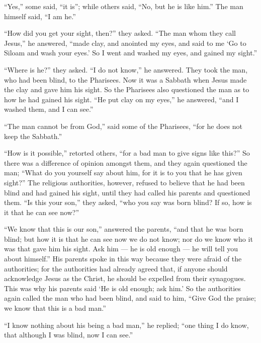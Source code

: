  ``Yes,'' some said, ``it is''; while others said, ``No, but
he is like him.'' The man himself said, ``I am he.''

 ``How did you get your sight, then?'' they asked.
 ``The man whom they call Jesus,'' he answered, ``made
clay, and anointed my eyes, and said to me `Go to Siloam and wash your
eyes.' So I went and washed my eyes, and gained my sight.''

 ``Where is he?'' they asked. ``I do not know,'' he
answered.  They took the man, who had been blind, to the
Pharisees.  Now it was a Sabbath when Jesus made the clay
and gave him his sight.  So the Pharisees also questioned
the man as to how he had gained his sight. ``He put clay on my eyes,''
he answered, ``and I washed them, and I can see.''

 ``The man cannot be from God,'' said some of the
Pharisees, ``for he does not keep the Sabbath.''

``How is it possible,'' retorted others, ``for a bad man to give signs
like this?''  So there was a difference of opinion amongst
them, and they again questioned the man; ``What do you yourself say
about him, for it is to you that he has given sight?''  The
religious authorities, however, refused to believe that he had been
blind and had gained his sight, until they had called his parents and
questioned them.  ``Is this your son,'' they asked, ``who
you say was born blind? If so, how is it that he can see now?''

 ``We know that this is our son,'' answered the parents,
``and that he was born blind;  but how it is that he can
see now we do not know; nor do we know who it was that gave him his
sight. Ask him --- he is old enough --- he will tell you about
himself.''  His parents spoke in this way because they were
afraid of the authorities; for the authorities had already agreed that,
if anyone should acknowledge Jesus as the Christ, he should be expelled
from their synagogues.  This was why his parents said `He
is old enough; ask him.'  So the authorities again called
the man who had been blind, and said to him, ``Give God the praise; we
know that this is a bad man.''

 ``I know nothing about his being a bad man,'' he replied;
``one thing I do know, that although I was blind, now I can see.''

